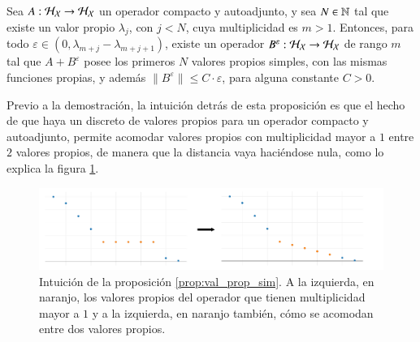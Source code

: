 \begin{prop}
    Sea $A: \mathcal{H}_{\mathcal{X}} \to \mathcal{H}_{\mathcal{X}}$ un operador compacto y autoadjunto, y sea $N \in \mathbb{N}$ tal que existe un valor propio $\lambda_j$, con $j < N$, cuya multiplicidad es $m > 1$. Entonces, para todo $\varepsilon \in (0, \lambda_{m+j} - \lambda_{m+j+1})$, existe un operador $B^\varepsilon: \mathcal{H}_{\mathcal{X}} \to \mathcal{H}_{\mathcal{X}}$ de rango $m$ tal que $A + B^\varepsilon$ posee los primeros $N$ valores propios simples, con las mismas funciones propias, y además $\| B^\varepsilon \| \leq C \cdot \varepsilon$, para alguna constante $C > 0$.
    \label{prop:val_prop_sim}
\end{prop}

Previo a la demostración, la intuición detrás de esta proposición es que el hecho de que haya un discreto de valores propios para un operador compacto y autoadjunto, permite acomodar valores propios con multiplicidad mayor a $1$ entre $2$ valores propios, de manera que la distancia vaya haciéndose nula, como lo explica la figura \ref{fig:simple_eig_vals}.

\begin{figure}[h!]
    \centering
    \includegraphics[width=1.0\linewidth]{img/content/chapter3/simple_eig_vals.pdf}
    \caption{Intuición de la proposición \ref{prop:val_prop_sim}. A la izquierda, en naranjo, los valores propios del operador que tienen multiplicidad mayor a $1$ y a la izquierda, en naranjo también, cómo se acomodan entre dos valores propios.}
    \label{fig:simple_eig_vals}
\end{figure}

